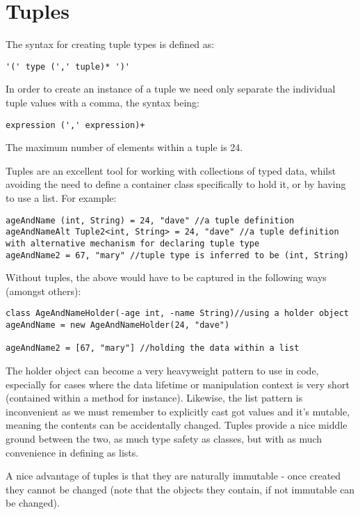 \documentclass[conc-doc]{subfiles}
\begin{document}
	
	\chapter[Tuples]{Tuples}
	\label{chap:tuples}
The syntax for creating tuple types is defined as:
\begin{center}
	\lstinline{'(' type (',' tuple)* ')'}
\end{center}

In order to create an instance of a tuple we need only separate the individual tuple values with a comma, the syntax being:
\begin{center}
	\lstinline{expression (',' expression)+}
\end{center}

The maximum number of elements within a tuple is 24.

Tuples are an excellent tool for working with collections of typed data, whilst avoiding the need to define a container class specifically to hold it, or by having to use a list. For example:
\begin{lstlisting}
ageAndName (int, String) = 24, "dave" //a tuple definition
ageAndNameAlt Tuple2<int, String> = 24, "dave" //a tuple definition with alternative mechanism for declaring tuple type
ageAndName2 = 67, "mary" //tuple type is inferred to be (int, String)
\end{lstlisting}

Without tuples, the above would have to be captured in the following ways (amongst others):
\begin{lstlisting}
class AgeAndNameHolder(-age int, -name String)//using a holder object
ageAndName = new AgeAndNameHolder(24, "dave")

ageAndName2 = [67, "mary"] //holding the data within a list
\end{lstlisting}

The holder object can become a very heavyweight pattern to use in code, especially for cases where the data lifetime or manipulation context is very short (contained within a method for instance). Likewise, the list pattern is inconvenient as we must remember to explicitly cast got values and it's mutable, meaning the contents can be accidentally changed. Tuples provide a nice middle ground between the two, as much type safety as classes, but with as much convenience in defining as lists.

A nice advantage of tuples is that they are naturally immutable - once created they cannot be changed (note that the objects they contain, if not immutable can be changed).
\end{document}

